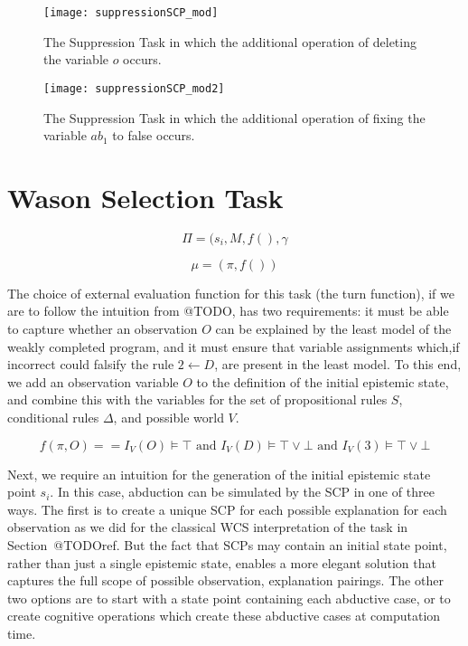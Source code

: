 \begin{figure*}
\begin{center}
\texttt{[image: suppressionSCP\_mod]}
\end{center}

\caption{The Suppression Task in which the additional operation of deleting the variable $o$ occurs.}
\label{fig:supmod}
\end{figure*}

\begin{figure*}
\begin{center}
\texttt{[image: suppressionSCP\_mod2]}
\end{center}

\caption{The Suppression Task in which the additional operation of fixing the variable $ab_1$ to false occurs.}
\label{fig:supmod2}
\end{figure*}
\section{Wason Selection Task}

\[\Pi=(s_i,M,f(),\gamma\]



\[\mu=(\pi,f())\]

The choice of external evaluation function for this task (the turn function), if we are to follow the intuition from @TODO, has two requirements: it must be able to capture whether an observation $O$ can be explained by the least model of the weakly completed program, and it must ensure that variable assignments which,if incorrect could falsify the rule $2\leftarrow D$, are present in the least model. To this end, we add an observation variable $O$ to the definition of the initial epistemic state, and combine this with the variables for the set of propositional rules $S$, conditional rules $\Delta$, and possible world $V$.



\[f(\pi,O)==  I_V(O)\models \top \textrm{ and } I_V(D)\models \top \lor \bot \textrm{ and } I_V(3)\models \top \lor \bot\]



Next, we require an intuition for the generation of the initial epistemic state point $s_i$. In this case, abduction can be simulated by the SCP in one of three ways. The first is to create a unique SCP for each possible explanation for each observation as we did for the classical WCS interpretation of the task in Section~@TODOref. But the fact that SCPs may contain an initial state point, rather than just a single epistemic state, enables a more elegant solution that captures the full scope of possible observation, explanation pairings. The other two options are to start with a state point containing each abductive case, or to create cognitive operations which create these abductive cases at computation time.

